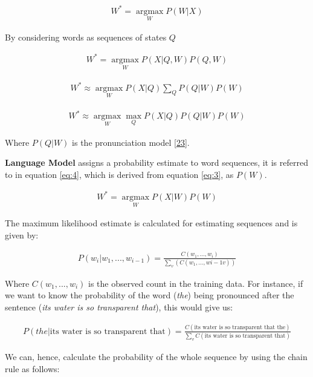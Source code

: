 \documentclass[
  a4paper,
]{article}
\begin{document}
\begin{align}
\label{eq:3}
W^* = \underset{W}{\operatorname{argmax}} P(W|X)
\end{align}

By considering words as sequences of states \(Q\)

\begin{align}
W^* = \underset{W}{\operatorname{argmax}} P(X|Q, W) P(Q,W)
\end{align}

\begin{align}
W^* \approx \underset{W}{\operatorname{argmax}} P(X|Q) \sum_QP(Q|W) P(W)
\end{align}

\begin{align}
W^* \approx \underset{W}{\operatorname{argmax}} \underset{Q}{\operatorname{max}} P(X|Q) P(Q|W) P(W)
\end{align}

Where \(P(Q|W)\) is the pronunciation model
\protect\hyperlink{ref-pronun}{{[}23{]}}.

\textbf{Language Model} assigns a probability estimate to word
sequences, it is referred to in equation \ref{eq:4}, which is derived
from equation \ref{eq:3}, as \(P(W)\).

\begin{align}
\label{eq:4}
W^* = \underset{W}{\operatorname{argmax}} P(X|W) P(W)
\end{align}

The maximum likelihood estimate is calculated for estimating sequences
and is given by:

\begin{align}
P(w_i|w_1,...,w_{i-1}) = \frac{C(w_1, ..., w_i)}{\sum_v(C(w_1,...,w{i-1}v))}
\end{align}

Where \(C(w_1, ..., w_i)\) is the observed count in the training data.
For instance, if we want to know the probability of the word
(\emph{the}) being pronounced after the sentence (\emph{its water is so
transparent that}), this would give us:

\begin{align}
P(the|\text{its water is so transparent that}) = \frac{C(\text{its water is so transparent that the})}{\sum_vC(\text{its water is so transparent that})}
\end{align}

We can, hence, calculate the probability of the whole sequence by using
the chain rule as follows:
\end{document}
